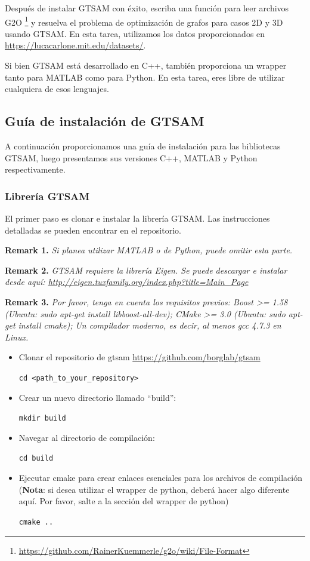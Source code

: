 \documentclass[tp]{lcc}
\begin{document}
Después de instalar GTSAM con éxito, escriba una función para leer archivos G2O \footnote{\url{https://github.com/RainerKuemmerle/g2o/wiki/File-Format}} y resuelva el problema de optimización de grafos para casos 2D y 3D usando GTSAM. En esta tarea, utilizamos los datos proporcionados en \url{https://lucacarlone.mit.edu/datasets/}.

Si bien GTSAM está desarrollado en C++, también proporciona un wrapper tanto para MATLAB como para Python. En esta tarea, eres libre de utilizar cualquiera de esos lenguajes.

\subsection*{Guía de instalación de GTSAM}
A continuación proporcionamos una guía de instalación para las bibliotecas GTSAM, luego presentamos sus versiones C++, MATLAB y Python respectivamente.

\subsubsection*{Librería GTSAM}
El primer paso es clonar e instalar la librería GTSAM. Las instrucciones detalladas se pueden encontrar en el repositorio.

\textbf{Remark 1.} \textit{Si planea utilizar MATLAB o de Python, puede omitir esta parte.}

\textbf{Remark 2.} \textit{GTSAM requiere la librería Eigen. Se puede descargar e instalar desde aquí: \url{http://eigen.tuxfamily.org/index.php?title=Main_Page}}

\textbf{Remark 3.} \textit{Por favor, tenga en cuenta los requisitos previos: Boost >= 1.58 (Ubuntu: sudo apt-get install libboost-all-dev); CMake >= 3.0 (Ubuntu: sudo apt-get install cmake); Un compilador moderno, es decir, al menos gcc 4.7.3 en Linux.}

\begin{itemize}
    \item Clonar el repositorio de gtsam \url{https://github.com/borglab/gtsam}
    
    \lstinline[style=bash]{cd <path_to_your_repository>}
    
    \item Crear un nuevo directorio llamado ``build'':
    
    \lstinline[style=bash]{mkdir build}
    
    \item Navegar al directorio de compilación:
    
    \lstinline[style=bash]{cd build}

    \item Ejecutar cmake para crear enlaces esenciales para los archivos de compilación (\textbf{Nota}: si desea utilizar el wrapper de python, deberá hacer algo diferente aquí. Por favor, salte a la sección del wrapper de python)

    \lstinline[style=bash]{cmake ..}
\end{itemize}
\end{document}
